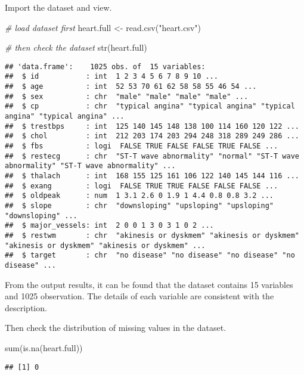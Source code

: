 \documentclass[
]{article}
\newenvironment{Shaded}{\begin{snugshade}}{\end{snugshade}}
\newcommand{\CommentTok}[1]{\textcolor[rgb]{0.56,0.35,0.01}{\textit{#1}}}
\newcommand{\FunctionTok}[1]{\textcolor[rgb]{0.00,0.00,0.00}{#1}}
\newcommand{\NormalTok}[1]{#1}
\newcommand{\OtherTok}[1]{\textcolor[rgb]{0.56,0.35,0.01}{#1}}
\newcommand{\StringTok}[1]{\textcolor[rgb]{0.31,0.60,0.02}{#1}}
\begin{document}
Import the dataset and view.

\begin{Shaded}
\begin{Highlighting}[]
\CommentTok{\# load dataset first}
\NormalTok{heart.full }\OtherTok{\textless{}{-}} \FunctionTok{read.csv}\NormalTok{(}\StringTok{"heart.csv"}\NormalTok{)}

\CommentTok{\# then check the dataset}
\FunctionTok{str}\NormalTok{(heart.full)}
\end{Highlighting}
\end{Shaded}

\begin{verbatim}
## 'data.frame':    1025 obs. of  15 variables:
##  $ id           : int  1 2 3 4 5 6 7 8 9 10 ...
##  $ age          : int  52 53 70 61 62 58 58 55 46 54 ...
##  $ sex          : chr  "male" "male" "male" "male" ...
##  $ cp           : chr  "typical angina" "typical angina" "typical angina" "typical angina" ...
##  $ trestbps     : int  125 140 145 148 138 100 114 160 120 122 ...
##  $ chol         : int  212 203 174 203 294 248 318 289 249 286 ...
##  $ fbs          : logi  FALSE TRUE FALSE FALSE TRUE FALSE ...
##  $ restecg      : chr  "ST-T wave abnormality" "normal" "ST-T wave abnormality" "ST-T wave abnormality" ...
##  $ thalach      : int  168 155 125 161 106 122 140 145 144 116 ...
##  $ exang        : logi  FALSE TRUE TRUE FALSE FALSE FALSE ...
##  $ oldpeak      : num  1 3.1 2.6 0 1.9 1 4.4 0.8 0.8 3.2 ...
##  $ slope        : chr  "downsloping" "upsloping" "upsloping" "downsloping" ...
##  $ major_vessels: int  2 0 0 1 3 0 3 1 0 2 ...
##  $ restwm       : chr  "akinesis or dyskmem" "akinesis or dyskmem" "akinesis or dyskmem" "akinesis or dyskmem" ...
##  $ target       : chr  "no disease" "no disease" "no disease" "no disease" ...
\end{verbatim}

From the output results, it can be found that the dataset contains 15
variables and 1025 observation. The details of each variable are
consistent with the description.

Then check the distribution of missing values in the dataset.

\begin{Shaded}
\begin{Highlighting}[]
\FunctionTok{sum}\NormalTok{(}\FunctionTok{is.na}\NormalTok{(heart.full))}
\end{Highlighting}
\end{Shaded}

\begin{verbatim}
## [1] 0
\end{verbatim}
\end{document}
